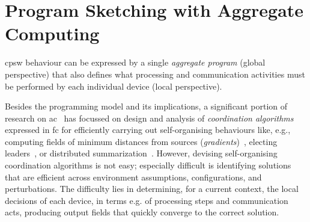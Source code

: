 


\sloppypar

\chapter[Collective Program Sketching]{Program Sketching with Aggregate Computing}\label{chap:learning:sketching}%
\minitoc%

\ac{cpsw} behaviour
 can be expressed by a single \emph{aggregate program} (global perspective)
 that also defines 
 what processing and communication activities
 must be performed by each individual device (local perspective).

Besides the programming model and its implications,
 a significant portion of research on \ac{ac}~\cite{DBLP:journals/jlap/ViroliBDACP19} has focussed
 on design and analysis of \emph{coordination algorithms} expressed in \ac{fc}
 for efficiently carrying out self-organising behaviours
 like, e.g., computing fields of minimum distances from sources (\emph{gradients})~\cite{DBLP:conf/ipsn/NagpalSB03,DBLP:journals/pervasive/MameiZL04,DBLP:conf/saso/AudritoCDV17},
 electing leaders~\cite{DBLP:conf/saso/MoBD18},
 or %
 distributed summarization~\cite{DBLP:journals/cee/AudritoCDPV21}.
%
However, devising self-organising coordination algorithms is not easy; especially difficult is identifying solutions
 that are efficient across environment assumptions, configurations, and perturbations.
%
The difficulty lies in determining, 
 for a current context,
 the local decisions of each device, 
 in terms e.g. of processing steps and communication acts,
 producing output fields that quickly converge to the correct solution.

